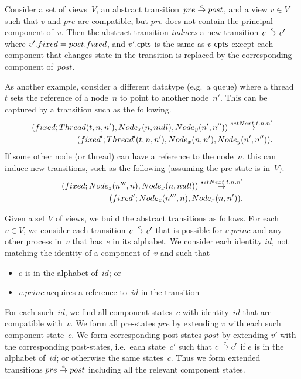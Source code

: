 \begin{definition}
Consider a set of views~$V$, an abstract transition~$pre \stackrel{e}\rightarrow post$, and
a view $v \in V$ such that $v$ and $pre$ are compatible, but $pre$ does not
contain the principal component of~$v$.  Then the abstract
transition \emph{induces} a new transition $v \stackrel{e}\rightarrow v'$ where $v'.fixed =
post.fixed$, and $v'.\mathsf{cpts}$ is the same as $v.\mathsf{cpts}$ except each component that
changes state in the transition is replaced by the corresponding component
of~$post$. 
\end{definition}

As another example, consider a different datatype (e.g.~a queue) where a
thread~$t$ sets the  reference of a node~$n$ to point to another
node~$n'$.  This can be captured by a transition such as the following.
\[
\begin{align}
(fixed; Thread(t, n, n'), Node_x(n, null), Node_y(n', n'')) 
  \stackrel{setNext.t.n.n'}\rightarrow \\
\qquad (fixed'; Thread'(t, n, n'), Node_x(n, n'), Node_y(n', n'')).
\end{align}
\]
If some other node (or thread) can have a reference to the node~$n$, this can
induce new transitions, such as the following (assuming the pre-state is
in~$V$). 
\[
\begin{align}
(fixed; Node_z(n''', n), Node_x(n, null))  \stackrel{setNext.t.n.n'}\rightarrow \\
\qquad  (fixed'; Node_z(n''', n), Node_x(n, n')).
\end{align}
\]


\begin{definition}
Given a set $V$ of views, we build the abstract transitions as follows.  For
each $v \in V$, we consider each transition $v \stackrel{e}\rightarrow v'$ that is possible
for $v.princ$ and any other process in~$v$ that has~$e$ in its alphabet.  We
consider each identity $id$, not matching the identity of a component of~$v$
and such that
%
\begin{itemize}
\item $e$ is in the alphabet of~$id$; or

\item $v.princ$ acquires a reference to~$id$ in the transition
\end{itemize}
%
For each such~$id$, we find all component states~$c$ with identity~$id$ that
are compatible with~$v$.  We form all pre-states $pre$ by extending $v$ with
each such component state~$c$.  We form corresponding post-states $post$ by
extending $v'$ with the corresponding post-states, i.e.\ each state~$c'$ such
that $c \stackrel{e}\rightarrow c'$ if $e$ is in the alphabet of~$id$; or otherwise the same
states~$c$.  Thus we form extended transitions $pre \stackrel{e}\rightarrow post$ including
all the relevant component states.

\end{definition}







